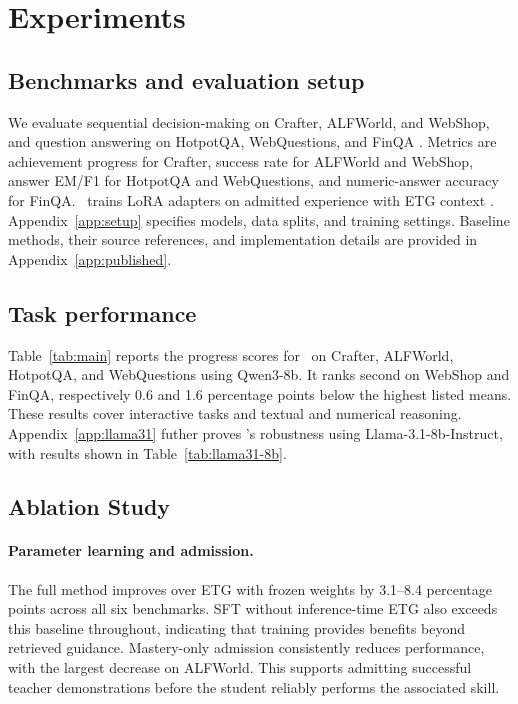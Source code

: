 \setcounter{topnumber}{2}
\section{Experiments}
\label{sec:experiments}

\subsection{Benchmarks and evaluation setup}
\label{sec:setup}

We evaluate sequential decision-making on Crafter, ALFWorld, and WebShop, and question answering on HotpotQA, WebQuestions, and FinQA \citep{hafner2022crafter,shridhar2021alfworld,yao2022webshop,yang2018hotpotqa,berant2013semantic,chen2021finqa}. Metrics are achievement progress for Crafter, success rate for ALFWorld and WebShop, answer EM/F1 for HotpotQA and WebQuestions, and numeric-answer accuracy for FinQA. \method\ trains LoRA adapters on admitted experience with ETG context \citep{hu2022lora}. Appendix~\ref{app:setup} specifies models, data splits, and training settings. Baseline methods, their source references, and implementation details are provided in Appendix~\ref{app:published}.


\subsection{Task performance}
\label{sec:performance}


Table~\ref{tab:main} reports the progress scores for \method\ on Crafter, ALFWorld, HotpotQA, and WebQuestions using Qwen3-8b. It ranks second on WebShop and FinQA, respectively 0.6 and 1.6 percentage points below the highest listed means. These results cover interactive tasks and textual and numerical reasoning. Appendix~\ref{app:llama31} futher proves \method's robustness using Llama-3.1-8b-Instruct, with results shown in Table~\ref{tab:llama31-8b}.

\vspace{-10pt}

\vspace{-10pt}

\subsection{Ablation Study}
\label{sec:ablations}


\paragraph{Parameter learning and admission.}
The full method improves over ETG with frozen weights by 3.1--8.4 percentage points across all six benchmarks. SFT without inference-time ETG also exceeds this baseline throughout, indicating that training provides benefits beyond retrieved guidance. Mastery-only admission consistently reduces performance, with the largest decrease on ALFWorld. This supports admitting successful teacher demonstrations before the student reliably performs the associated skill.

